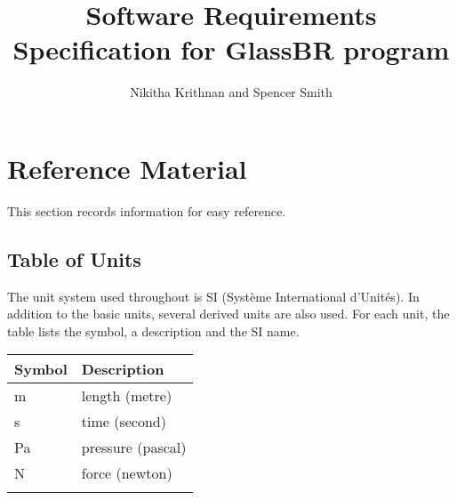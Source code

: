 \documentclass[12pt]{article}
\title{Software Requirements Specification for GlassBR program}
\author{Nikitha Krithnan and Spencer Smith}
\begin{document}
\maketitle
\tableofcontents
\newpage
\section{Reference Material}
\label{Sec:RefeMate}
This section records information for easy reference.
\subsection{Table of Units}
\label{Sec:TablofUnit}
The unit system used throughout is SI (Syst\`{e}me International d'Unit\'{e}s). In addition to the basic units, several derived units are also used. For each unit, the table lists the symbol, a description and the SI name.
\begin{longtable*}{l l}
\toprule
Symbol & Description
\\
\midrule
m & length (metre)
\\
s & time (second)
\\
Pa & pressure (pascal)
\\
N & force (newton)
\\
\bottomrule
\label{Table:TablofUnit}
\end{longtable*}
\end{document}
